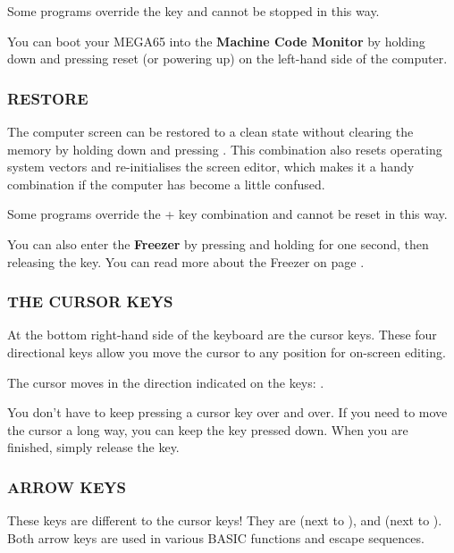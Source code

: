 Some programs override the  key and cannot be stopped in this way.

You can boot your MEGA65 into the {\bf Machine Code Monitor} by holding down  and pressing reset (or powering up) on the left-hand side of the computer.

\subsubsection{RESTORE}
The computer screen can be restored to a clean state without clearing the memory by holding down  and pressing . This combination also resets operating system vectors and re-initialises the screen editor, which makes it a handy combination if the computer has become a little confused.

Some programs override the  +  key combination and cannot be reset in this way.

You can also enter the {\bf Freezer} by pressing and holding  for one second, then releasing the key. You can
read more about the Freezer on page \pageref{sec:freezer}.

\subsubsection{THE CURSOR KEYS}
\nopagebreak
At the bottom right-hand side of the keyboard are the cursor keys. These four directional keys allow you move the cursor to any position for on-screen editing.

The cursor moves in the direction indicated on the keys: \megakey{$\leftarrow$} \megakey{$\uparrow$} \megakey{$\rightarrow$} \megakey{$\downarrow$}.

You don't have to keep pressing a cursor key over and over. If you need to move the cursor a long way, you can keep the key pressed down. When you are finished, simply release the key.

\subsubsection{ARROW KEYS}
These keys are different to the cursor keys! They are \megakeywhite{$\leftarrow$} (next to ), and \megakeywhite{$\uparrow$} (next to ).
Both arrow keys are used in various BASIC functions and escape sequences.

